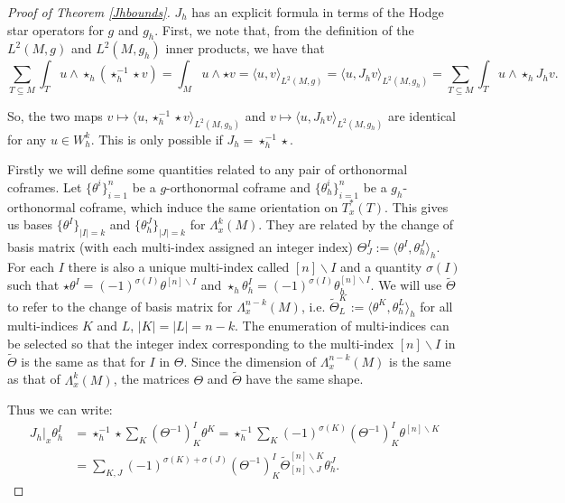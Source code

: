 \documentclass[11pt]{article}
\newcommand{\iprod}[1]{\langle #1 \rangle}
\begin{document}
\begin{proof}[Proof of Theorem \ref{Jhbounds}]

$J_h$ has an explicit formula in terms of the Hodge star operators for $g$ and $g_h$. First, we note that, from the definition of the $L^2(M,g)$ and $L^2(M,g_h)$ inner products, we have that
\[\sum_{T \subseteq M} \int_T u \wedge \star_h (\star_h^{-1} \star v) = \int_M u \wedge \star v = \iprod{u,v}_{L^2(M,g)} = \iprod{u,J_hv}_{L^2(M,g_h)} = \sum_{T \subseteq M} \int_T u \wedge \star_h J_h v.\]

So, the two maps $v \mapsto \iprod{u,\star_h^{-1}\star v}_{L^2(M,g_h)}$ and $v \mapsto \iprod{u,J_hv}_{L^2(M,g_h)}$ are identical for any $u \in W_h^k$. This is only possible if $J_h = \star_h^{-1}\star$.

Firstly we will define some quantities related to any pair of orthonormal coframes. Let $\{\theta^i\}_{i = 1}^n$ be a $g$-orthonormal coframe  and $\{\theta^i_h\}_{i = 1}^n$ be a $g_h$-orthonormal coframe, which induce the same orientation on $T_x^*(T)$. This gives us bases $\{\theta^I\}_{|I| = k}$ and $\{\theta^J_h\}_{|J| = k}$ for $\Lambda^k_x(M)$. They are related by the change of basis matrix (with each multi-index assigned an integer index) $\Theta^I_J := \iprod{\theta^I,\theta^J_h}_h$. For each $I$ there is also a unique multi-index called $[n]\backslash I$ and a quantity $\sigma(I)$ such that $\star \theta^I = (-1)^{\sigma(I)}\theta^{[n]\backslash I}$ and $\star_h \theta^I_h = (-1)^{\sigma(I)} \theta^{[n]\backslash I}_h$. We will use $\tilde\Theta$ to refer to the change of basis matrix for $\Lambda^{n-k}_x(M)$, i.e. $\tilde\Theta^K_L := \iprod{\theta^K,\theta_h^L}_h$ for all multi-indices $K$ and $L$, $|K| = |L| = n-k$. The enumeration of multi-indices can be selected so that the integer index corresponding to the multi-index $[n]\backslash I$ in $\tilde \Theta$ is the same as that for $I$ in $\Theta$. Since the dimension of $\Lambda^{n-k}_x(M)$ is the same as that of $\Lambda^k_x(M)$, the matrices $\Theta$ and $\tilde \Theta$ have the same shape.

Thus we can write:
\begin{align*}J_h|_x \theta^I_h &= \star_h^{-1}\star\sum_K(\Theta^{-1})^I_K\theta^K = \star_h^{-1}\sum_K(-1)^{\sigma(K)}(\Theta^{-1})^I_K\theta^{[n]\backslash K} \\
&= \sum_{K,J}(-1)^{\sigma(K) + \sigma(J)}(\Theta^{-1})^I_K\tilde\Theta^{[n]\backslash K}_{[n]\backslash J} \theta^J_h.\end{align*}


\end{proof}
\end{document}
